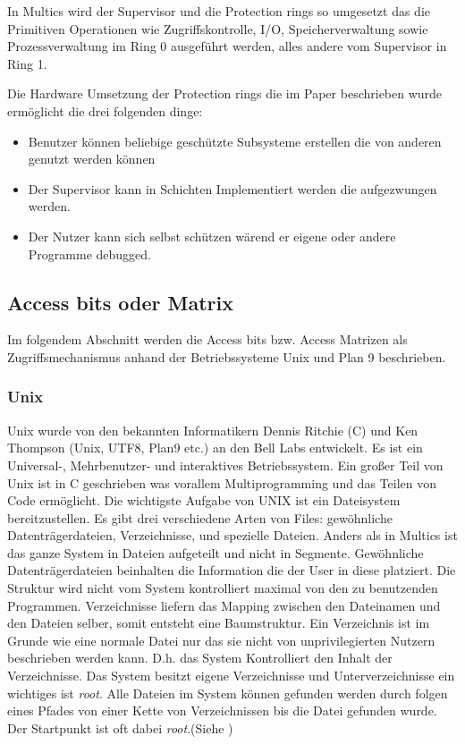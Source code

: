 \documentclass[11pt,technote]{IEEEtran}
\begin{document}
        In Multics wird der Supervisor und die Protection rings so umgesetzt das die Primitiven Operationen wie Zugriffskontrolle, I/O, Speicherverwaltung sowie
        Prozessverwaltung im Ring 0 ausgef\"uhrt werden, alles andere vom Supervisor in Ring 1.
    
        Die Hardware Umsetzung der Protection rings die im Paper \cite{inproc:protec-rings} beschrieben wurde erm\"oglicht die drei folgenden dinge:
		    \begin{itemize}
		      \item Benutzer k\"onnen beliebige gesch\"utzte Subsysteme erstellen die von anderen genutzt werden k\"onnen
		      \item Der Supervisor kann in Schichten Implementiert werden die aufgezwungen werden.
		      \item Der Nutzer kann sich selbst sch\"utzen w\"arend er eigene oder andere Programme debugged.
		    \end{itemize}
    
    \subsection{Access bits oder Matrix} \label{sec:secure:access}
      Im folgendem Abschnitt werden die Access bits bzw. Access Matrizen als Zugriffsmechanismus anhand der Betriebssysteme Unix und Plan 9 beschrieben.
      \subsubsection{Unix}
		    Unix wurde von den bekannten Informatikern Dennis Ritchie (C) und Ken Thompson (Unix, UTF8, Plan9 etc.) an den Bell Labs entwickelt.
		    Es ist ein Universal-, Mehrbenutzer- und interaktives Betriebssystem. Ein gro\ss er Teil von Unix ist in C geschrieben was vorallem Multiprogramming
		    und das Teilen von Code erm\"oglicht. Die wichtigste Aufgabe von UNIX ist ein Dateisystem bereitzustellen. Es gibt drei verschiedene Arten von Files:
		    gew\"ohnliche Datentr\"agerdateien, Verzeichnisse, und spezielle Dateien. Anders als in Multics ist das ganze System in Dateien aufgeteilt und nicht in
		    Segmente. Gew\"ohnliche Datentr\"agerdateien beinhalten die Information die der User in diese platziert. Die Struktur wird nicht vom System kontrolliert maximal
		    von den zu benutzenden Programmen. Verzeichnisse liefern das Mapping zwischen den Dateinamen und den Dateien selber, somit entsteht eine Baumstruktur.
		    Ein Verzeichnis ist im Grunde wie eine normale Datei nur das sie nicht von unprivilegierten Nutzern beschrieben werden kann. D.h. das System Kontrolliert den
		    Inhalt der Verzeichnisse. Das System besitzt eigene Verzeichnisse und Unterverzeichnisse ein wichtiges ist \textit{root}.
		    Alle Dateien im System k\"onnen gefunden werden durch folgen eines Pfades von einer Kette von Verzeichnissen bis die Datei gefunden wurde. 
		    Der Startpunkt ist oft dabei \textit{root}.(Siehe \cite[S. 366]{inproc:unix})
		    
\end{document}
